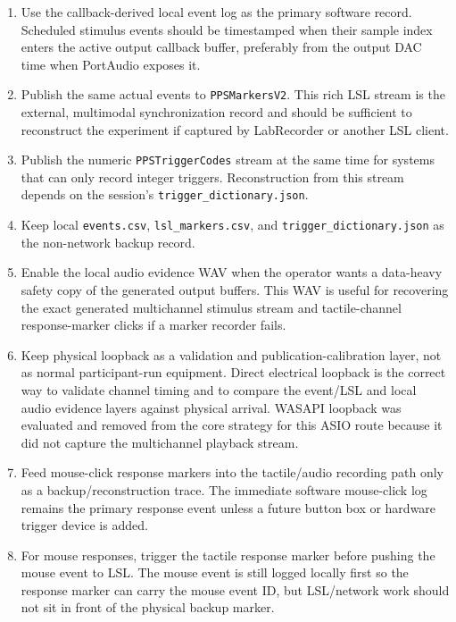\documentclass[11pt]{article}
\begin{document}
\begin{enumerate}
  \item Use the callback-derived local event log as the primary software record.
  Scheduled stimulus events should be timestamped when their sample index enters
  the active output callback buffer, preferably from the output DAC time when
  PortAudio exposes it.
  \item Publish the same actual events to \texttt{PPSMarkersV2}. This rich LSL
  stream is the external, multimodal synchronization record and should be
  sufficient to reconstruct the experiment if captured by LabRecorder or another
  LSL client.
  \item Publish the numeric \texttt{PPSTriggerCodes} stream at the same time for
  systems that can only record integer triggers. Reconstruction from this stream
  depends on the session's \texttt{trigger\_dictionary.json}.
  \item Keep local \texttt{events.csv}, \texttt{lsl\_markers.csv}, and
  \texttt{trigger\_dictionary.json} as the non-network backup record.
  \item Enable the local audio evidence WAV when the operator wants a data-heavy
  safety copy of the generated output buffers. This WAV is useful for recovering
  the exact generated multichannel stimulus stream and tactile-channel
  response-marker clicks if a marker recorder fails.
  \item Keep physical loopback as a validation and publication-calibration
  layer, not as normal participant-run equipment. Direct electrical loopback is
  the correct way to validate channel timing and to compare the event/LSL and
  local audio evidence layers against physical arrival. WASAPI loopback was
  evaluated and removed from the core strategy for this ASIO route because it
  did not capture the multichannel playback stream.
  \item Feed mouse-click response markers into the tactile/audio recording path
  only as a backup/reconstruction trace. The immediate software mouse-click log
  remains the primary response event unless a future button box or hardware
  trigger device is added.
  \item For mouse responses, trigger the tactile response marker before pushing
  the mouse event to LSL. The mouse event is still logged locally first so the
  response marker can carry the mouse event ID, but LSL/network work should not
  sit in front of the physical backup marker.
\end{enumerate}
\end{document}
